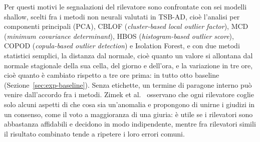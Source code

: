 Per questi motivi le segnalazioni del rilevatore sono confrontate con sei modelli shallow, scelti fra i metodi non neurali valutati in TSB-AD, cioè l'analisi per componenti principali (PCA), CBLOF (\emph{cluster-based local outlier factor}), MCD (\emph{minimum covariance determinant}), HBOS (\emph{histogram-based outlier score}), COPOD (\emph{copula-based outlier detection}) e Isolation Forest, e con due metodi statistici semplici, la distanza dal normale, cioè quanto un valore si allontana dal normale stagionale della sua cella, del giorno e dell'ora, e la variazione in tre ore, cioè quanto è cambiato rispetto a tre ore prima: in tutto otto baseline (Sezione~\ref{sec:exp-baseline}). Senza etichette, un termine di paragone interno può venire dall'accordo fra i metodi. Zimek et al.~\cite{zimek2014ensembles} osservano che ogni rilevatore coglie solo alcuni aspetti di che cosa sia un'anomalia e propongono di unirne i giudizi in un consenso, come il voto a maggioranza di una giuria: è utile se i rilevatori sono abbastanza affidabili e decidono in modo indipendente, mentre fra rilevatori simili il risultato combinato tende a ripetere i loro errori comuni.

